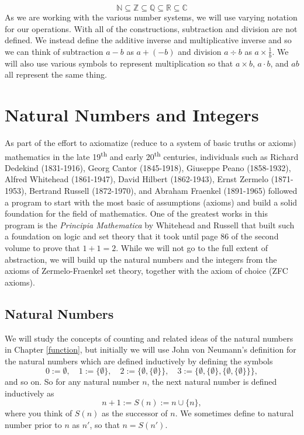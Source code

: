\documentclass[
]{book}
\let\stdsection\section
\renewcommand\section{\newpage\stdsection}
\theoremstyle{definition}
\theoremstyle{definition}
\theoremstyle{definition}
\theoremstyle{definition}
\theoremstyle{remark}
\begin{document}
\[\mathbb{N} \subseteq \mathbb{Z} \subseteq \mathbb{Q} \subseteq \mathbb{R} \subseteq \mathbb{C}\]
As we are working with the various number systems, we will use varying notation for our operations. With all of the constructions, subtraction and division are not defined. We instead define the additive inverse and multiplicative inverse and so we can think of subtraction \(a-b\) as \(a+(-b)\) and division \(a\div b\) as \(a \times \frac{1}{b}\). We will also use various symbols to represent multiplication so that \(a\times b\), \(a\cdot b\), and \(ab\) all represent the same thing.

\hypertarget{Integers}{%
\section{Natural Numbers and Integers}\label{Integers}}

As part of the effort to axiomatize (reduce to a system of basic truths or axioms) mathematics in the late 19\textsuperscript{th} and early 20\textsuperscript{th} centuries, individuals such as Richard Dedekind (1831-1916), Georg Cantor (1845-1918), Giuseppe Peano (1858-1932), Alfred Whitehead (1861-1947), David Hilbert (1862-1943), Ernst Zermelo (1871-1953), Bertrand Russell (1872-1970), and Abraham Fraenkel (1891-1965) followed a program to start with the most basic of assumptions (axioms) and build a solid foundation for the field of mathematics. One of the greatest works in this program is the \emph{Principia Mathematica} by Whitehead and Russell \citetext{\citeyear{Principia1}; \citeyear{Principia2}; \citeyear{Principia3}} that built such a foundation on logic and set theory that it took until page 86 of the second volume to prove that \(1+1=2\). While we will not go to the full extent of abstraction, we will build up the natural numbers and the integers from the axioms of Zermelo-Fraenkel set theory, together with the axiom of choice (ZFC axioms).

\hypertarget{natural-numbers}{%
\subsection{Natural Numbers}\label{natural-numbers}}

We will study the concepts of counting and related ideas of the natural numbers in Chapter \ref{function}, but initially we will use John von Neumann's \citeyearpar{vonNeumann23} definition for the natural numbers which are defined inductively by defining the symbols
\[0:=\emptyset, \quad 1:=\{\emptyset\}, \quad 2:=\{\emptyset, \{\emptyset\}\}, \quad 3:=\{\emptyset, \{\emptyset\}, \{\emptyset, \{\emptyset\} \}\},\] and so on. So for any natural number \(n\), the next natural number is defined inductively as \[n+1:=S(n) := n\cup \{n\},\] where you think of \(S(n)\) as the successor of \(n\). We sometimes define to natural number prior to \(n\) as \(n'\), so that \(n=S(n')\).
\end{document}
